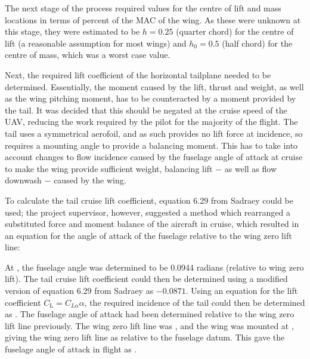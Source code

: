 \documentclass[../../main.tex]{subfiles}
\begin{document}
The next stage of the process required values for the centre of lift and mass locations in terms of percent of the MAC of the wing.
As these were unknown at this stage, they were estimated to be $h = 0.25$ (quarter chord) for the centre of lift (a reasonable assumption for most wings) and $h_0 = 0.5$ (half chord) for the centre of mass, which was a worst case value. 

Next, the required lift coefficient of the horizontal tailplane needed to be determined.
Essentially, the moment caused by the lift, thrust and weight, as well as the wing pitching moment, has to be counteracted by a moment provided by the tail.
It was decided that this should be negated at the cruise speed of the UAV, reducing the work required by the pilot for the majority of the flight.
The tail uses a symmetrical aerofoil, and as such provides no lift force at  incidence, so requires a mounting angle to provide a balancing moment.
This has to take into account changes to flow incidence caused by the fuselage angle of attack at cruise to make the wing provide sufficient weight, balancing lift $-$ as well as flow downwash $-$ caused by the wing. 

To calculate the tail cruise lift coefficient, equation 6.29 from Sadraey \cite{sadraey-13} could be used; the project supervisor, however, suggested a method which rearranged a substituted force and moment balance of the aircraft in cruise, which resulted in an equation for the angle of attack of the fuselage relative to the wing zero lift line: 


At , the fuselage angle was determined to be 0.0944 radians (relative to wing zero lift).
The tail cruise lift coefficient could then be determined using a modified version of equation 6.29 from Sadraey \cite{sadraey-13} as $-0.0871$.
Using an equation for the lift coefficient $C_\mathrm{L} = C_{L\alpha}\alpha$, the required incidence of the tail could then be determined as .  %
The fuselage angle of attack had been determined relative to the wing zero lift line previously.
The wing zero lift line was , and the wing was mounted at , giving the wing zero lift line as  relative to the fuselage datum.
This gave the fuselage angle of attack in flight as .  
\end{document}
